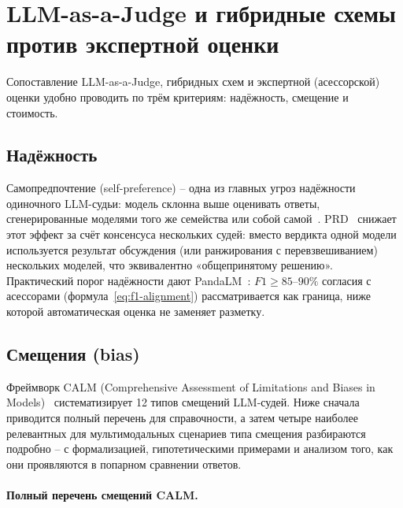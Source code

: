 \section{LLM-as-a-Judge и гибридные схемы против экспертной оценки}
\label{sec:related:hybrid-baselines}

Сопоставление LLM-as-a-Judge, гибридных схем и экспертной (асессорской)
оценки удобно проводить по трём критериям: надёжность, смещение и
стоимость.

\subsection{Надёжность}

Самопредпочтение (self-preference) -- одна из главных угроз надёжности
одиночного LLM-судьи: модель склонна выше оценивать ответы,
сгенерированные моделями того же семейства или собой
самой~\cite{wataoka2024selfpreference}.
PRD~\cite{li2023prd} снижает этот эффект за счёт консенсуса нескольких
судей: вместо вердикта одной модели используется результат обсуждения
(или ранжирования с перевзвешиванием) нескольких моделей, что
эквивалентно «общепринятому решению».
Практический порог надёжности дают PandaLM~\cite{wang2023pandalm}:
$F1 \ge 85$--$90\%$ согласия с асессорами
(формула~\eqref{eq:f1-alignment}) рассматривается как граница, ниже
которой автоматическая оценка не заменяет разметку.

\subsection{Смещения (bias)}

Фреймворк CALM (Comprehensive Assessment of Limitations and Biases in
Models)~\cite{ye2024justice} систематизирует 12 типов смещений
LLM-судей.
Ниже сначала приводится полный перечень для справочности, а затем
четыре наиболее релевантных для мультимодальных сценариев типа
смещения разбираются подробно -- с формализацией, гипотетическими
примерами и анализом того, как они проявляются в попарном
сравнении ответов.

\paragraph{Полный перечень смещений CALM.}

